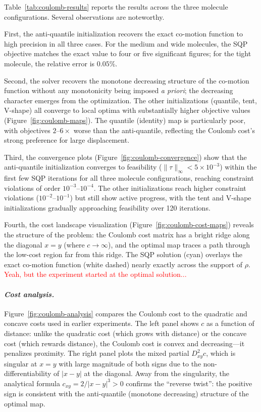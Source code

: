 \documentclass[12pt,leqno]{amsart}
\newcounter{experiment}
\newcommand{\harsha}[1]{\textcolor{red}{#1}}
\begin{document}
Table~\ref{tab:coulomb-results} reports the results across the three molecule configurations. Several observations are noteworthy.

First, the anti-quantile initialization recovers the exact co-motion function to high precision in all three cases. For the medium and wide molecules, the SQP objective matches the exact value to four or five significant figures; for the tight molecule, the relative error is $0.05\%$. 

Second, the solver recovers the monotone decreasing structure of the co-motion function without any monotonicity being imposed \emph{a priori}; the decreasing character emerges from the optimization. The other initializations (quantile, tent, V-shape) all converge to local optima with substantially higher objective values (Figure~\ref{fig:coulomb-maps}). The quantile (identity) map is particularly poor, with objectives $2$--$6\times$ worse than the anti-quantile, reflecting the Coulomb cost's strong preference for large displacement.

Third, the convergence plots (Figure~\ref{fig:coulomb-convergence}) show that the anti-quantile initialization converges to feasibility ($\|\tau\|_\infty < 5 \times 10^{-3}$) within the first few SQP iterations for all three molecule configurations, reaching constraint violations of order $10^{-3}$--$10^{-4}$. 
The other initializations reach higher constraint violations ($10^{-2}$--$10^{-1}$) but still show active progress, with the tent and V-shape initializations gradually approaching feasibility over 120 iterations.

Fourth, the cost landscape visualization (Figure~\ref{fig:coulomb-cost-maps}) reveals the structure of the problem: the Coulomb cost matrix has a bright ridge along the diagonal $x = y$ (where $c \to \infty$), and the optimal map traces a path through the low-cost region far from this ridge. The SQP solution (cyan) overlays the exact co-motion function (white dashed) nearly exactly across the support of $\rho$. \harsha{Yeah, but the experiment started at the optimal solution...}

\paragraph{\it Cost analysis.}
Figure~\ref{fig:coulomb-analysis} compares the Coulomb cost to the quadratic and concave costs used in earlier experiments. The left panel shows $c$ as a function of distance: unlike the quadratic cost (which grows with distance) or the concave cost (which rewards distance), the Coulomb cost is convex and decreasing---it penalizes proximity. The right panel plots the mixed partial $D^2_{xy}c$, which is singular at $x = y$ with large magnitude of both signs due to the non-differentiability of $|x-y|$ at the diagonal. Away from the singularity, the analytical formula $c_{xy} = 2/|x-y|^3 > 0$ confirms the ``reverse twist'': the positive sign is consistent with the anti-quantile (monotone decreasing) structure of the optimal map.
\end{document}
